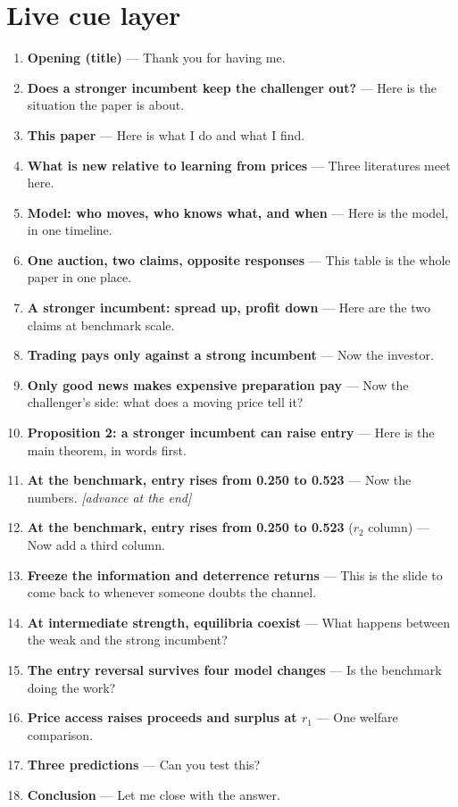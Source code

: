 \documentclass[11pt]{article}
\begin{document}
\section*{Live cue layer}
{\raggedright\small
\begin{enumerate}\setlength{\itemsep}{0.25em}
  \item \textbf{Opening (title)} --- Thank you for having me.
  \item \textbf{Does a stronger incumbent keep the challenger out?} --- Here is the situation the paper is about.
  \item \textbf{This paper} --- Here is what I do and what I find.
  \item \textbf{What is new relative to learning from prices} --- Three literatures meet here.
  \item \textbf{Model: who moves, who knows what, and when} --- Here is the model, in one timeline.
  \item \textbf{One auction, two claims, opposite responses} --- This table is the whole paper in one place.
  \item \textbf{A stronger incumbent: spread up, profit down} --- Here are the two claims at benchmark scale.
  \item \textbf{Trading pays only against a strong incumbent} --- Now the investor.
  \item \textbf{Only good news makes expensive preparation pay} --- Now the challenger's side: what does a moving price tell it?
  \item \textbf{Proposition 2: a stronger incumbent can raise entry} --- Here is the main theorem, in words first.
  \item \textbf{At the benchmark, entry rises from 0.250 to 0.523} --- Now the numbers. \textit{[advance at the end]}
  \item \textbf{At the benchmark, entry rises from 0.250 to 0.523} ($r_2$ column) --- Now add a third column.
  \item \textbf{Freeze the information and deterrence returns} --- This is the slide to come back to whenever someone doubts the channel.
  \item \textbf{At intermediate strength, equilibria coexist} --- What happens between the weak and the strong incumbent?
  \item \textbf{The entry reversal survives four model changes} --- Is the benchmark doing the work?
  \item \textbf{Price access raises proceeds and surplus at $r_1$} --- One welfare comparison.
  \item \textbf{Three predictions} --- Can you test this?
  \item \textbf{Conclusion} --- Let me close with the answer.
\end{enumerate}\par}
\end{document}
